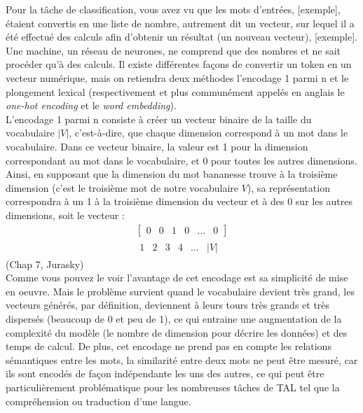 \documentclass[12pt, french, twoside]{report}
\begin{document}
Pour la tâche de classification, vous avez vu que les mots d'entrées, [exemple], étaient convertis en une liste de nombre, autrement dit un vecteur, sur lequel il a été effectué des calculs afin d'obtenir un résultat (un nouveau vecteur), [exemple]. Une machine, un réseau de neurones, ne comprend que des nombres et ne sait procéder qu'à des calculs. Il existe différentes façons de convertir un token en un vecteur numérique, mais on retiendra deux méthodes l'encodage 1 parmi n et le plongement lexical (respectivement et plus communément appelés en anglais le \textit{one-hot encoding} et le \textit{word embedding}).\\

L'encodage 1 parmi n consiste à créer un vecteur binaire de la taille du vocabulaire $|V|$, c'est-à-dire, que chaque dimension correspond à un mot dans le vocabulaire. Dans ce vecteur binaire, la valeur est 1 pour la dimension correspondant au mot dans le vocabulaire, et 0 pour toutes les autres dimensions. Ainsi, en supposant que la dimension du mot \og bananes\fg se trouve à la troisième dimension (c'est le troisième mot de notre vocabulaire $V$), sa représentation correspondra à un 1 à la troisième dimension du vecteur et à des 0 sur les autres dimensions, soit le vecteur :
\begin{align*}
    \begin{bmatrix}
    0 & 0 & 1 & 0 & \dots & 0
    \end{bmatrix}\\
    \begin{matrix}
    1 & 2 & 3 & 4 & \dots & |V|
    \end{matrix}
\end{align*}
\hfill (Chap 7, Jurasky)\cite{jurafsky_ffnn}\\

Comme vous pouvez le voir l'avantage de cet encodage est sa simplicité de mise en oeuvre. Mais le problème survient quand le vocabulaire devient très grand, les vecteurs générés, par définition, deviennent à leurs tours très grands et très dispersés (beaucoup de 0 et peu de 1), ce qui entraine une augmentation de la complexité du modèle (le nombre de dimension pour décrire les données) et des temps de calcul. De plus, cet encodage ne prend pas en compte les relations sémantiques entre les mots, la similarité entre deux mots ne peut être mesuré,  car ils sont encodés de façon indépendante les uns des autres, ce qui peut être particulièrement problématique pour les nombreuses tâches de TAL tel que la compréhension ou traduction d'une langue.
\end{document}
